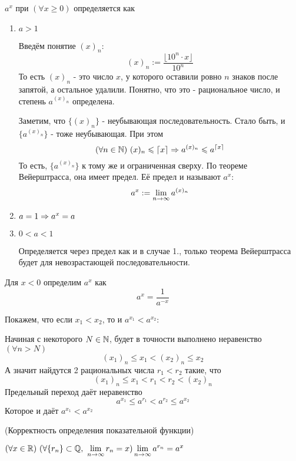 \begin{definition}
	$a^x$ при $(\forall x \ge 0)$ определяется как
	\begin{enumerate}
		\item $a > 1$
		
		Введём понятие $(x)_n$:
		\[
			(x)_n := \frac{\lfloor10^n \cdot x\rfloor}{10^n}
		\]
		То есть $(x)_n$ - это число $x$, у которого оставили ровно $n$ знаков после запятой, а остальное удалили. Понятно, что это - рациональное число, и степень $a^{(x)_n}$ определена.
		
		Заметим, что $\{(x)_n\}$ - неубывающая последовательность. Стало быть, и $\{a^{(x)_n}\}$ - тоже неубывающая. При этом
		\[
			(\forall n \in \mathbb{N})\ (x)_n \leqslant \lceil x \rceil \Rightarrow a^{(x)_n} \leqslant a^{\lceil x \rceil}
		\]
		То есть, $\{a^{(x)_n}\}$ к тому же и ограниченная сверху. По теореме Вейерштрасса, она имеет предел. Её предел и называют $a^x$:
		\[
			a^x := \lim\limits_{n \to \infty} a^{(x)_n}
		\]
		
		\item $a = 1 \Rightarrow a^x = a$
		
		\item $0 < a < 1$
		
		Определяется через предел как и в случае 1., только теорема Вейерштрасса будет для невозрастающей последовательности.
	\end{enumerate}

	Для $x < 0$ определим $a^x$ как
	\[
		a^x = \frac{1}{a^{-x}}
	\]
	
	Покажем, что если $x_1 < x_2$, то и $a^{x_1} < a^{x_2}$:
	
	Начиная с некоторого $N \in \mathbb{N}$, будет в точности выполнено неравенство $(\forall n > N)$
	\[
		(x_1)_n \le x_1 < (x_2)_n \le x_2 
	\]
	А значит найдутся 2 рациональных числа $r_1 < r_2$ такие, что
	\[
		(x_1)_n \le x_1 < r_1 < r_2 < (x_2)_n
	\]
	Предельный переход даёт неравенство
	\[
		a^{x_1} \le a^{r_1} < a^{r_2} \le a^{x_2}
	\]
	Которое и даёт $a^{x_1} < a^{x_2}$
\end{definition}

\begin{lemma} (Корректность определения показательной функции)~
	
	$(\forall x \in \mathbb{R})\ (\forall \{r_n\} \subset \mathbb{Q},\ \lim\limits_{n \to \infty} r_n = x) \lim\limits_{n \to \infty} a^{r_n} = a^x$
\end{lemma}

